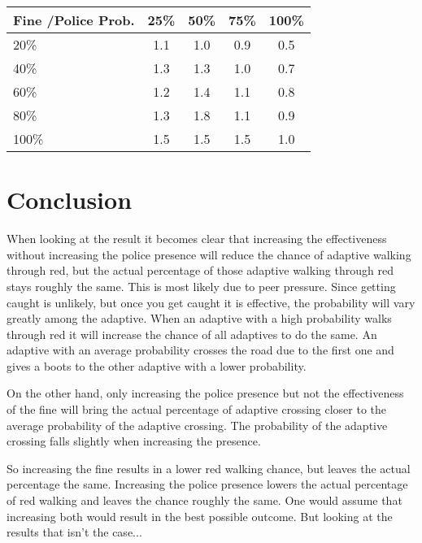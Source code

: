 \documentclass[a4paper]{article}
\begin{document}
\begin{table}[H]
\centering
\begin{tabular}{ l | c c c c }
  Fine \slash Police Prob. & 25\% & 50\% & 75\% & 100\% \\ 
  \hline
  20\%  & 1.1 & 1.0 & 0.9 & 0.5  \\
  40\%  & 1.3 & 1.3 & 1.0 & 0.7  \\
  60\%  & 1.2 & 1.4 & 1.1 & 0.8  \\
  80\%  & 1.3 & 1.8 & 1.1 & 0.9  \\
  100\% & 1.5 & 1.5 & 1.5 & 1.0  \\
\end{tabular}
\end{table}

\clearpage

\section{Conclusion}
When looking at the result it becomes clear that increasing the effectiveness without increasing the police presence will reduce the chance of adaptive walking through red, but the actual percentage of those adaptive walking through red stays roughly the same. This is most likely due to peer pressure. Since getting caught is unlikely, but once you get caught it is effective, the probability will vary greatly among the adaptive. When an adaptive with a high probability walks through red it will increase the chance of all adaptives to do the same. An adaptive with an average probability crosses the road due to the first one and gives a boots to the other adaptive with a lower probability.

On the other hand, only increasing the police presence but not the effectiveness of the fine will bring the actual percentage of adaptive crossing closer to the average probability of the adaptive crossing. The probability of the adaptive crossing falls slightly when increasing the presence.

So increasing the fine results in a lower red walking chance, but leaves the actual percentage the same. Increasing the police presence lowers the actual percentage of red walking and leaves the chance roughly the same. One would assume that increasing both would result in the best possible outcome. But looking at the results that isn't the case...

\clearpage

\begin{thebibliography}{3}


\end{thebibliography}
\end{document}
